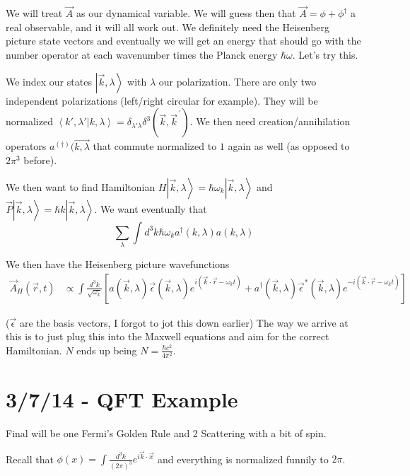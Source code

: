 \documentclass[10pt]{report}
\newcommand{\ket}[1]{\left|#1\right>}
\newcommand{\dotp}[2]{\left<#1\left.\right|#2\right>}
\newcommand{\pvec}[1]{\vec{#1}^{\,\prime}}
\begin{document}
We will treat $\vec{A}$ as our dynamical variable. We will guess then that $\vec{A} = \phi + \phi^\dagger$ a real observable, and it will all work out. We definitely need the Heisenberg picture state vectors and eventually we will get an energy that should go with the number operator at each wavenumber times the Planck energy $\hbar \omega$. Let's try this.

We index our states $\ket{\vec{k}, \lambda}$ with $\lambda$ our polarization. There are only two independent polarizations (left/right circular for example). They will be normalized $\dotp{k', \lambda'}{k, \lambda} = \delta_{\lambda' \lambda}\delta^3\left( \vec{k}, \pvec{k} \right)$. We then need creation/annihilation operators $a^{(\dagger)}(\vec{k, \lambda}$ that commute normalized to $1$ again as well (as opposed to $2\pi^3$ before).

We then want to find Hamiltonian $H\ket{\vec{k}, \lambda} = \hbar \omega_k \ket{\vec{k}, \lambda}$ and $\vec{P}\ket{\vec{k}, \lambda} = \hbar k \ket{\vec{k}, \lambda}$. We want eventually that
\begin{equation}
    \sum_{\lambda}^{}\int d^3k \hbar\omega_k a^\dagger(k,\lambda)a(k, \lambda)
\end{equation}

We then have the Heisenberg picture wavefunctions
\begin{align}
    \vec{A}_H(\vec{r},t) &\propto \int \frac{d^3k}{\sqrt{\omega_k}}\left[ a(\vec{k},\lambda) \vec{\epsilon}(\vec{k},\lambda)e^{i\left( \vec{k}\cdot \vec{r} - \omega_k t \right)} + a^\dagger(\vec{k},\lambda)\vec{\epsilon}^*(\vec{k},\lambda)e^{-i\left( \vec{k}\cdot \vec{r} - \omega_k t \right)} \right]
\end{align}

($\vec{\epsilon}$ are the basis vectors, I forgot to jot this down earlier) The way we arrive at this is to just plug this into the Maxwell equations and aim for the correct Hamiltonian. $N$ ends up being $N = \frac{\hbar c^2}{4\pi^2}$. 

\chapter{3/7/14 - QFT Example}

Final will be one Fermi's Golden Rule and 2 Scattering with a bit of spin. 

Recall that $\phi(x) = \int \frac{d^3k}{(2\pi)^3} e^{i\vec{k}\cdot \vec{x}}$ and everything is normalized funnily to $2\pi$. 
\end{document}
